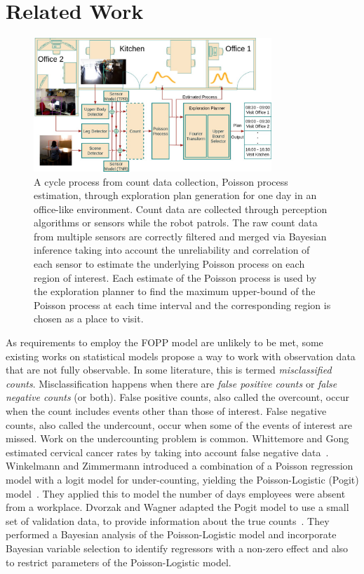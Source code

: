 
\section{Related Work}
\label{sec:related}
\begin{figure}[t!]
	\centering
	\includegraphics[width=0.8\textwidth]{./figures/popp_exploration_process.jpeg}
	\caption{A cycle process from count data collection, Poisson process estimation, through exploration plan generation for one day in an office-like environment. Count data are collected through perception algorithms or sensors while the robot patrols. The raw count data from multiple sensors are correctly filtered and merged via Bayesian inference taking into account the unreliability and correlation of each sensor to estimate the underlying Poisson process on each region of interest. Each estimate of the Poisson process is used by the exploration planner to find the maximum upper-bound of the Poisson process at each time interval and the corresponding region is chosen as a place to visit.} 
	\label{fig:popp_exploration_process_diagram}
	\vspace{-25pt}
\end{figure}
As requirements to employ the FOPP model are unlikely to be met, some existing works on statistical models propose a way to work with observation data that are not fully observable. In some literature, this is termed \emph{misclassified counts}. Misclassification happens when there are \emph{false positive counts} or \emph{false negative counts} (or both). False positive counts, also called the overcount, occur when the count includes events other than those of interest. False negative counts, also called the undercount, occur when some of the events of interest are missed. Work on the undercounting problem is common. Whittemore and Gong estimated cervical cancer rates by taking into account false negative data~\cite{whittemore1991}. Winkelmann and Zimmermann introduced a combination of a Poisson regression model with a logit model for under-counting, yielding the Poisson-Logistic (Pogit) model~\cite{winkelmann1993poisson}. They applied this to model the number of days employees were absent from a workplace. Dvorzak and Wagner adapted the Pogit model to use a small set of validation data, to provide information about the true counts~\cite{dvorzak2016}. They performed a Bayesian analysis of the Poisson-Logistic model and incorporate Bayesian variable selection to identify regressors with a non-zero effect and also to restrict parameters of the Poisson-Logistic model.

